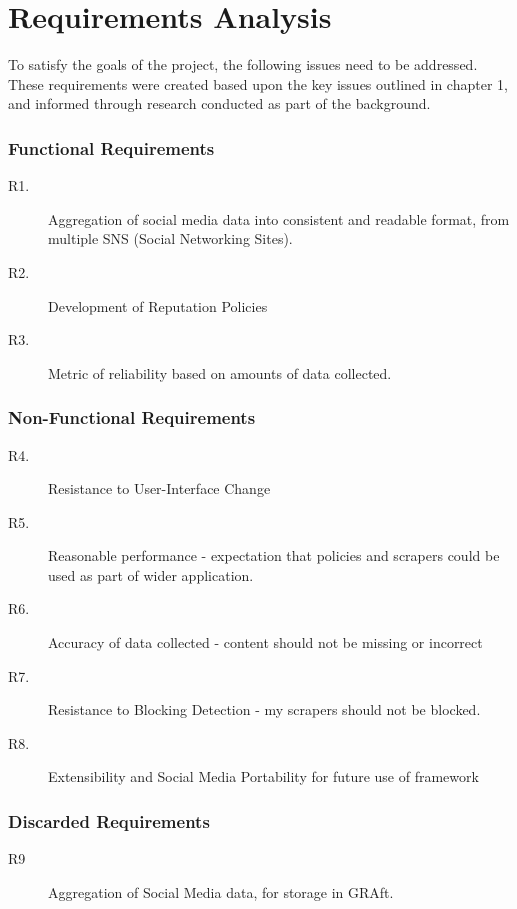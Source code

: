 \chapter{Requirements Analysis}\label{C:us}

To satisfy the goals of the project, the following issues need to be addressed. These requirements were created based upon the key issues outlined in chapter 1, and informed through research conducted as part of the background. 

\subsection{Functional Requirements}

\begin{description}
 \item [R1.] Aggregation of social media data into consistent and readable format, from multiple SNS (Social Networking Sites).
 \item [R2.] Development of Reputation Policies
 \item [R3.] Metric of reliability based on amounts of data collected.
\end{description}

\subsection{Non-Functional Requirements}

\begin{description}
 \item [R4.] Resistance to User-Interface Change
 \item [R5.] Reasonable performance - expectation that policies and scrapers could be used as part of wider application.
 \item [R6.] Accuracy of data collected - content should not be missing or incorrect
 \item [R7.] Resistance to Blocking Detection - my scrapers should not be blocked.
 \item [R8.] Extensibility and Social Media Portability for future use of framework
\end{description}

\subsection{Discarded Requirements}

\begin{description}
 \item [R9] Aggregation of Social Media data, for storage in GRAft.
\end{description}


